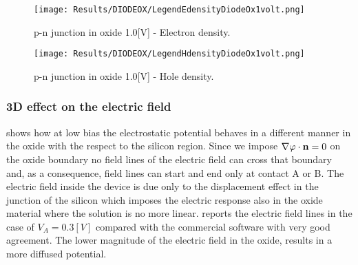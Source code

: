 \vspace{0.5cm}

\begin{figure}[!h]
\centering
{}
\hspace{0.1\textwidth}
\hspace{0.04\textwidth}
{\texttt{[image: Results/DIODEOX/LegendEdensityDiodeOx1volt.png]}}
\caption{p-n junction in oxide 1.0[V] - Electron density.}
\label{fig: edensity diodeox 1V}
\end{figure}

\vspace{0.5cm}

\begin{figure}[!h]
\centering
{}
\hspace{0.1\textwidth}
\hspace{0.04\textwidth}
{\texttt{[image: Results/DIODEOX/LegendHdensityDiodeOx1volt.png]}}
\caption{p-n junction in oxide 1.0[V] - Hole density.}
\label{fig: hdensity diodeox 1V}
\end{figure}

\clearpage





\subsubsection{3D effect on the electric field}


 shows how at low bias the electrostatic potential behaves in a different manner in the oxide with the respect to the silicon region.
Since we impose $\nabla \varphi \cdot \mathbf{n}=0$ on the oxide boundary no field lines of the electric field can cross that boundary and, as a consequence, field lines can start and end only at contact A or B.
The electric field inside the device is due only to the displacement effect in the junction of the silicon which imposes the electric response also in the oxide material where the solution is no more linear.  reports the electric field lines in the case of $V_A=0.3[V]$ compared with the commercial software with very good agreement. The lower magnitude of the electric field in the oxide, results in a more diffused potential.

